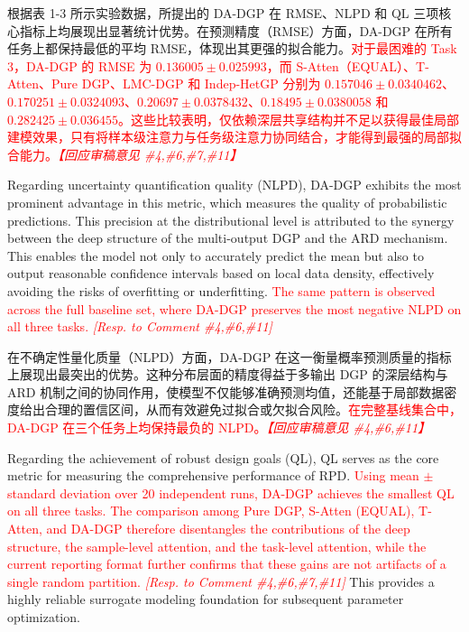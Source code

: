 \documentclass[11pt]{article}
\begin{document}
根据表 1-3 所示实验数据，所提出的 DA-DGP 在 RMSE、NLPD 和 QL 三项核心指标上均展现出显著统计优势。在预测精度（RMSE）方面，DA-DGP 在所有任务上都保持最低的平均 RMSE，体现出其更强的拟合能力。\textcolor{red}{对于最困难的 Task 3，DA-DGP 的 RMSE 为 $0.136005 \pm 0.025993$，而 S-Atten（EQUAL）、T-Atten、Pure DGP、LMC-DGP 和 Indep-HetGP 分别为 $0.157046 \pm 0.0340462$、$0.170251 \pm 0.0324093$、$0.20697 \pm 0.0378432$、$0.18495 \pm 0.0380058$ 和 $0.282425 \pm 0.036455$。这些比较表明，仅依赖深层共享结构并不足以获得最佳局部建模效果，只有将样本级注意力与任务级注意力协同结合，才能得到最强的局部拟合能力。\textit{【回应审稿意见 \#4,\#6,\#7,\#11】}}

Regarding uncertainty quantification quality (NLPD), DA-DGP exhibits the most prominent advantage in this metric, which measures the quality of probabilistic predictions. This precision at the distributional level is attributed to the synergy between the deep structure of the multi-output DGP and the ARD mechanism. This enables the model not only to accurately predict the mean but also to output reasonable confidence intervals based on local data density, effectively avoiding the risks of overfitting or underfitting. \textcolor{red}{The same pattern is observed across the full baseline set, where DA-DGP preserves the most negative NLPD on all three tasks. \textit{[Resp. to Comment \#4,\#6,\#11]}}

在不确定性量化质量（NLPD）方面，DA-DGP 在这一衡量概率预测质量的指标上展现出最突出的优势。这种分布层面的精度得益于多输出 DGP 的深层结构与 ARD 机制之间的协同作用，使模型不仅能够准确预测均值，还能基于局部数据密度给出合理的置信区间，从而有效避免过拟合或欠拟合风险。\textcolor{red}{在完整基线集合中，DA-DGP 在三个任务上均保持最负的 NLPD。\textit{【回应审稿意见 \#4,\#6,\#11】}}

Regarding the achievement of robust design goals (QL), QL serves as the core metric for measuring the comprehensive performance of RPD. \textcolor{red}{Using mean $\pm$ standard deviation over 20 independent runs, DA-DGP achieves the smallest QL on all three tasks. The comparison among Pure DGP, S-Atten (EQUAL), T-Atten, and DA-DGP therefore disentangles the contributions of the deep structure, the sample-level attention, and the task-level attention, while the current reporting format further confirms that these gains are not artifacts of a single random partition. \textit{[Resp. to Comment \#4,\#6,\#7,\#11]}} This provides a highly reliable surrogate modeling foundation for subsequent parameter optimization.
\end{document}
